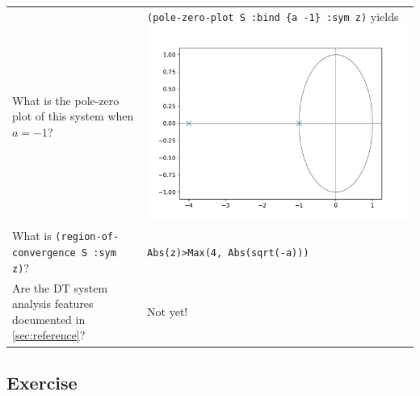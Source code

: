 \documentclass[11pt,letter]{article}
\begin{document}
\begin{longtable}{ p{} p{} }
  What is the pole-zero plot of this system when $a=-1$?
  &
  \lstinline!(pole-zero-plot S :bind {a -1} :sym z)! yields
  \includegraphics[width=\linewidth]{figs/pz-discrete} \\

  What is \lstinline!(region-of-convergence S :sym z)!?
  &
  \lstinline!Abs(z)>Max(4, Abs(sqrt(-a)))! \\

  Are the DT system analysis features documented in \cref{sec:reference}?
  &
  Not yet! \\

  \midrule

  \bottomrule

\end{longtable}

\newpage

\subsection{Exercise}\label{sec:tutorial:exercise}
\end{document}
